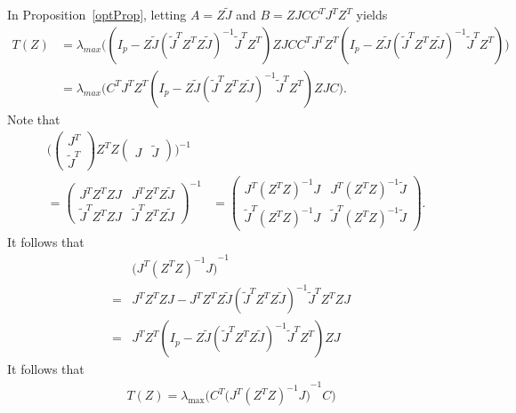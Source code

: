 \documentclass[review]{elsarticle}
\theoremstyle{plain}
\theoremstyle{definition}
\theoremstyle{remark}
\begin{document}
In Proposition~\ref{optProp}, letting $A=Z\tilde{J}$ and $B=ZJ C C^T J^TZ^T$ yields 
$$
\begin{aligned}
    T(Z)&=\lambda_{max}\big((I_p-
    Z\tilde{J}{(\tilde{J}^T Z^T Z\tilde{J})}^{-1}\tilde{J}^T Z^T
    )ZJCC^TJ^TZ^T (I_p-
    Z\tilde{J}{(\tilde{J}^T Z^T Z\tilde{J})}^{-1}\tilde{J}^T Z^T
    )\big)
\\
    &=\lambda_{max}\big(C^TJ^TZ^T (I_p-
    Z\tilde{J}{(\tilde{J}^T Z^T Z\tilde{J})}^{-1}\tilde{J}^T Z^T
    )ZJC\big).
\end{aligned}
$$
Note that
\begin{equation}
    \begin{aligned}
        &\Big(
        \begin{pmatrix}
            J^T\\
            \tilde{J}^T
        \end{pmatrix}
        Z^T Z
        \begin{pmatrix}
            J&\tilde{J}
        \end{pmatrix}
        \Big)^{-1}\\
        &=
        \begin{pmatrix}
            J^T Z^T ZJ & J^T Z^T Z\tilde{J}\\
            \tilde{J}^T Z^T ZJ & \tilde{J}^T Z^T Z \tilde{J}
        \end{pmatrix}^{-1}
        &=
        \begin{pmatrix}
            J^T {(Z^T Z)}^{-1}J & J^T {(Z^T Z)}^{-1}\tilde{J}\\
            \tilde{J}^T {(Z^T Z)}^{-1}J & \tilde{J}^T {(Z^T Z)}^{-1} \tilde{J}
        \end{pmatrix}.
    \end{aligned}
\end{equation}
It follows that
\begin{equation}
    \begin{aligned}
        &{\big( J^T {(Z^T Z)}^{-1}J \big)}^{-1}\\
        =&J^T Z^T ZJ - J^T Z^T Z\tilde{J}{(\tilde{J}^T Z^T Z \tilde{J})}^{-1}
            \tilde{J}^T Z^T ZJ \\
        =& J^T Z^T( I_p- Z\tilde{J}{(\tilde{J}^T Z^T Z \tilde{J})}^{-1}
            \tilde{J}^T Z^T) ZJ 
    \end{aligned}
\end{equation}
It follows that
\begin{equation}
    \begin{aligned}
        T(Z)=
        \lambda_{\max}\Big(C^T{\big( J^T {(Z^T Z)}^{-1}J \big)}^{-1}C\Big)\\
    \end{aligned}
\end{equation}
\end{document}
